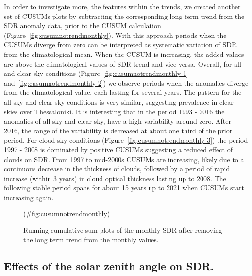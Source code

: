 \documentclass[
  preprint, 3p, authoryear]{article}
\begin{document}
In order to investigate more, the features within the trends, we created another set of CUSUMs plots by subtracting the corresponding long term trend from the SDR anomaly data, prior to the CUSUM calculation (Figure~\ref{fig:cusumnotrendmonthly}).
With this approach periods when the CUSUMs diverge from zero can be interpreted as systematic variation of SDR from the climatological mean. When the CUSUM is increasing, the added values are above the climatological values of SDR trend and vice versa.
Overall, for all- and clear-sky conditions (Figure~\ref{fig:cusumnotrendmonthly-1} and~\ref{fig:cusumnotrendmonthly-2}) we observe periods when the anomalies diverge from the climatological value, each lasting for several years.
The pattern for the all-sky and clear-sky conditions is very similar, suggesting prevalence in clear skies over Thessaloniki.
It is interesting that in the period 1993 - 2016 the anomalies of all-sky and clear-sky, have a high variability around zero. After 2016, the range of the variability is decreased at about one third of the prior period.
For cloud-sky conditions (Figure~\ref{fig:cusumnotrendmonthly-3}) the period 1997 - 2008 is dominated by positive CUSUMs suggesting a reduced effect of clouds on SDR.
From 1997 to mid-2000s CUSUMs are increasing, likely due to a continuous decrease in the thickness of clouds, followed by a period of rapid increase (within 3 years) in cloud optical thickness lasting up to 2008.
The following stable period spans for about 15 years up to 2021 when CUSUMs start increasing again.

\begin{figure}[h!]

{\centering {}

}

\caption{Running cumulative sum plots of the monthly SDR after removing the long term trend from the monthly values.}(\#fig:cusumnotrendmonthly)
\end{figure}

\hypertarget{effects-of-the-solar-zenith-angle-on-sdr.}{%
\subsection{Effects of the solar zenith angle on SDR.}\label{effects-of-the-solar-zenith-angle-on-sdr.}}
\end{document}
